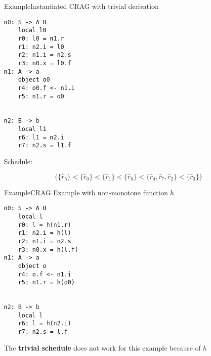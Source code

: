 

\begin{frame}[fragile=singleslide]{Example}{Instantiated CRAG with trivial derivation}

\begin{multicols}{3}
\begin{Verbatim}[fontsize=\small]
n0: S -> A B
    local l0
    r0: l0 = n1.r
    r1: n2.i = l0
    r2: n1.i = n2.s
    r3: n0.x = l0.f
n1: A -> a
    object o0
    r4: o0.f <- n1.i
    r5: n1.r = o0


n2: B -> b
    local l1
    r6: l1 = n2.i
    r7: n2.s = l1.f
\end{Verbatim}
\end{multicols}

Schedule: 

\[
     \Big \{ \{ \hat{r}_5 \} < \{ \hat{r}_0 \} < \{ \hat{r}_1 \} < \{ \hat{r}_6 \} < \{ \hat{r}_4 , \hat{r}_7, \hat{r}_2 \} < \{ \hat{r}_3 \}  \Big \}
\]

\end{frame}





\begin{frame}[fragile=singleslide]{Example}{CRAG Example with non-monotone function $h$}

\begin{multicols}{3}
\begin{Verbatim}[fontsize=\small]
n0: S -> A B
    local l
    r0: l = h(n1.r)
    r1: n2.i = h(l)
    r2: n1.i = n2.s
    r3: n0.x = h(l.f)
n1: A -> a
    object o
    r4: o.f <- n1.i
    r5: n1.r = h(o0)


n2: B -> b
    local l
    r6: l = h(n2.i)
    r7: n2.s = l.f
\end{Verbatim}
\end{multicols}

\newlinevspace

The \textbf{trivial schedule} \alert{does not work} for this example because of $h$

\end{frame}

